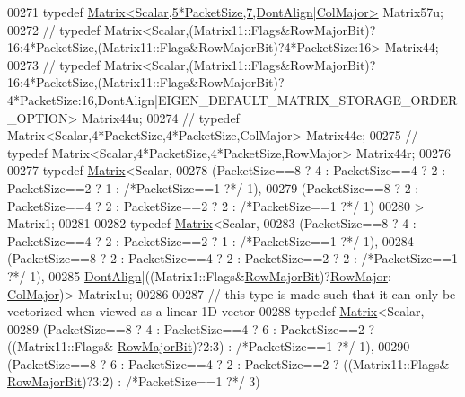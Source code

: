 \begin{DoxyCode}
00271     \textcolor{keyword}{typedef} \hyperlink{group___core___module_class_eigen_1_1_matrix}{Matrix<Scalar,5*PacketSize,7,DontAlign|ColMajor>}
       Matrix57u;
00272 \textcolor{comment}{//     typedef
       Matrix<Scalar,(Matrix11::Flags&RowMajorBit)?16:4*PacketSize,(Matrix11::Flags&RowMajorBit)?4*PacketSize:16> Matrix44;}
00273 \textcolor{comment}{//     typedef
       Matrix<Scalar,(Matrix11::Flags&RowMajorBit)?16:4*PacketSize,(Matrix11::Flags&RowMajorBit)?4*PacketSize:16,DontAlign|EIGEN\_DEFAULT\_MATRIX\_STORAGE\_ORDER\_OPTION> Matrix44u;}
00274 \textcolor{comment}{//     typedef Matrix<Scalar,4*PacketSize,4*PacketSize,ColMajor> Matrix44c;}
00275 \textcolor{comment}{//     typedef Matrix<Scalar,4*PacketSize,4*PacketSize,RowMajor> Matrix44r;}
00276 
00277     \textcolor{keyword}{typedef} \hyperlink{group___core___module_class_eigen_1_1_matrix}{Matrix}<Scalar,
00278         (PacketSize==8 ? 4 : PacketSize==4 ? 2 : PacketSize==2 ? 1 : \textcolor{comment}{/*PacketSize==1 ?*/} 1),
00279         (PacketSize==8 ? 2 : PacketSize==4 ? 2 : PacketSize==2 ? 2 : \textcolor{comment}{/*PacketSize==1 ?*/} 1)
00280       > Matrix1;
00281 
00282     \textcolor{keyword}{typedef} \hyperlink{group___core___module_class_eigen_1_1_matrix}{Matrix}<Scalar,
00283         (PacketSize==8 ? 4 : PacketSize==4 ? 2 : PacketSize==2 ? 1 : \textcolor{comment}{/*PacketSize==1 ?*/} 1),
00284         (PacketSize==8 ? 2 : PacketSize==4 ? 2 : PacketSize==2 ? 2 : \textcolor{comment}{/*PacketSize==1 ?*/} 1),
00285       \hyperlink{group__enums_ggaacded1a18ae58b0f554751f6cdf9eb13a40a452614141522dd313363dbbd65726}{DontAlign}|((Matrix1::Flags&\hyperlink{group__flags_gae4f56c2a60bbe4bd2e44c5b19cbe8762}{RowMajorBit})?\hyperlink{group__enums_ggaacded1a18ae58b0f554751f6cdf9eb13acfcde9cd8677c5f7caf6bd603666aae3}{RowMajor}:
      \hyperlink{group__enums_ggaacded1a18ae58b0f554751f6cdf9eb13a0cbd4bdd0abcfc0224c5fcb5e4f6669a}{ColMajor})> Matrix1u;
00286 
00287     \textcolor{comment}{// this type is made such that it can only be vectorized when viewed as a linear 1D vector}
00288     \textcolor{keyword}{typedef} \hyperlink{group___core___module_class_eigen_1_1_matrix}{Matrix}<Scalar,
00289         (PacketSize==8 ? 4 : PacketSize==4 ? 6 : PacketSize==2 ? ((Matrix11::Flags&
      \hyperlink{group__flags_gae4f56c2a60bbe4bd2e44c5b19cbe8762}{RowMajorBit})?2:3) : \textcolor{comment}{/*PacketSize==1 ?*/} 1),
00290         (PacketSize==8 ? 6 : PacketSize==4 ? 2 : PacketSize==2 ? ((Matrix11::Flags&
      \hyperlink{group__flags_gae4f56c2a60bbe4bd2e44c5b19cbe8762}{RowMajorBit})?3:2) : \textcolor{comment}{/*PacketSize==1 ?*/} 3)

\end{DoxyCode}
